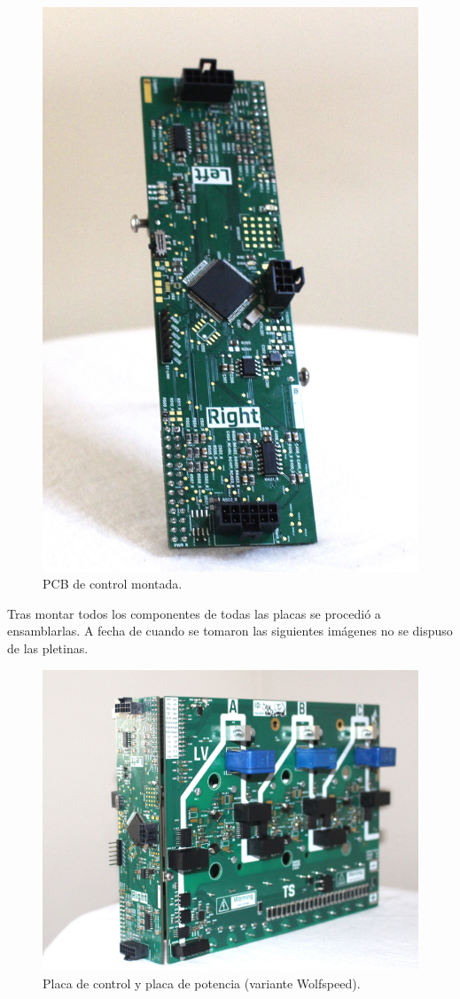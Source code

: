 \begin{figure}[H]
	\centering
	\includegraphics[width=0.5\linewidth]{fig/assembly9}
	\caption{PCB de control montada.}
\end{figure}


Tras montar todos los componentes de todas las placas se procedió a ensamblarlas. A fecha de cuando se tomaron las siguientes imágenes no se dispuso de las pletinas.

\begin{figure}[H]
	\centering
	\includegraphics[width=0.7\linewidth]{fig/assembly6}
	\caption{Placa de control y placa de potencia (variante Wolfspeed).}
\end{figure}


